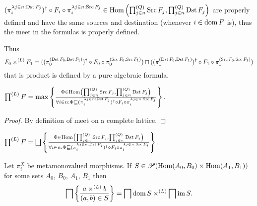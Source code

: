 \begin{rem}
  $(\pi^{\lambda j \in n : \operatorname{Dst} F_j}_i)^{\dagger} \circ F_i \circ
  \pi^{\lambda j \in n : \operatorname{Src} F_j}_i \in \operatorname{Hom} \left(
  \prod^{(Q)}_{j \in n} \operatorname{Src} F_j , \prod^{(Q)}_{j \in n} \operatorname{Dst} F_j
  \right)$ are properly defined and have the same sources and destination
  (whenever $i \in \operatorname{dom} F$ is), thus the meet in the formulas is
  properly defined.
\end{rem}

\begin{rem}
  Thus
  \[ F_0 \times^{(L)} F_1 = ((\pi^{(\operatorname{Dst} F_0 , \operatorname{Dst}
     F_1)}_0)^{\dagger} \circ F_0 \circ \pi^{(\operatorname{Src} F_0 , \operatorname{Src}
     F_1)}_0) \sqcap ((\pi^{(\operatorname{Dst} F_0 , \operatorname{Dst} F_1)}_1)^{\dagger}
     \circ F_1 \circ \pi^{(\operatorname{Src} F_0 , \operatorname{Src} F_1)}_1) \]
  that is product is defined by a pure algebraic formula.
\end{rem}

\begin{prop}
  $\prod^{(L)} F = \max \left\{ \frac{ \Phi \in \operatorname{Hom} \left( \prod^{(Q)}_{j \in
  n} \operatorname{Src} F_j , \prod^{(Q)}_{j \in n} \operatorname{Dst} F_j \right)
  }{ \forall i \in n : \Phi \sqsubseteq (\pi^{\lambda
  j \in n : \operatorname{Dst} F_j}_i)^{\dagger} \circ F_i \circ \pi^{\lambda j \in n
  : \operatorname{Src} F_j}_i }\right\}$.
\end{prop}

\begin{proof}
  By definition of meet on a complete lattice.
\end{proof}

\begin{cor}
  $\prod^{(L)} F = \bigsqcup \setcond{ \Phi \in \Hom \left( \prod^{(Q)}_{j
  \in n} \Src F_j , \prod^{(Q)}_{j \in n} \Dst F_j \right)
  }{ \forall i \in n : \Phi \sqsubseteq (\pi^{\lambda
  j \in n : \Dst F_j}_i)^{\dagger} \circ F_i \circ \pi^{\lambda j \in n
  : \Src F_j}_i }$.
\end{cor}

\begin{thm}
  Let $\pi^X_i$ be metamonovalued morphisms. If $S \in \mathscr{P} (\operatorname{Hom}
  (A_0 , B_0) \times \operatorname{Hom} (A_1 , B_1))$ for some sets $A_0$, $B_0$,
  $A_1$, $B_1$ then
  \[ \bigsqcap \left\{ \frac{ a \times^{(L)} b }{(a , b)\in S }\right\} =
     \bigsqcap \operatorname{dom} S \times^{(L)} \bigsqcap \operatorname{im} S. \]
\end{thm}

